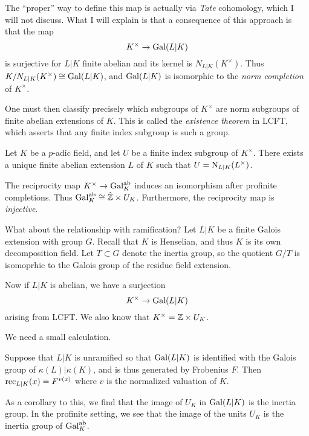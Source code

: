 The ``proper'' way to define this map is actually via \emph{Tate} cohomology, which I will not discuss.
What I will explain is that a consequence of this approach is that the map
\[ K^{\times} \to \operatorname{Gal}(L|K) \]
is surjective for $L|K$ finite abelian and its kernel is $N_{L|K}(K^{\times})$.
Thus $K/N_{L|K}(K^{\times}) \cong \operatorname{Gal}(L|K)$, and $\operatorname{Gal}(L|K)$ is isomorphic to the \emph{norm completion} of $K^{\times}$.

One must then classify precisely which subgroups of $K^{\times}$ are norm subgroups of finite abelian extensions of $K$.
This is called the \emph{existence theorem} in LCFT, which asserts that any finite index subgroup is such a group.

\begin{theorem}
  Let $K$ be a $p$-adic field, and let $U$ be a finite index subgroup of $K^{\times}$.
  There exists a unique finite abelian extension $L$ of $K$ such that $U = \operatorname{N}_{L|K}(L^{\times})$.
\end{theorem}

\begin{corollary}
  The reciprocity map $K^{\times} \to \operatorname{Gal}_{K}^{\mathrm{ab}}$ induces an isomorphism after profinite completions.
  Thus $\operatorname{Gal}_{K}^{\mathrm{ab}} \cong \hat{\mathbb{Z}} \times U_{K}$.
  Furthermore, the reciprocity map is \emph{injective}.
\end{corollary}

What about the relationship with ramification?
Let $L|K$ be a finite Galois extension with group $G$.
Recall that $K$ is Henselian, and thus $K$ is its own decomposition field.
Let $T \subset G$ denote the inertia group, so the quotient $G/T$ is isomoprhic to the Galois group of the residue field extension.

Now if $L|K$ is abelian, we have a surjection
\[ K^{\times} \to \operatorname{Gal}(L|K) \]
arising from LCFT.
We also know that $K^{\times} = \mathbb{Z} \times U_{K}$.

We need a small calculation.
\begin{lemma}
  Suppose that $L|K$ is unramified so that $\operatorname{Gal}(L|K)$ is identified with the Galois group of $\kappa(L)|\kappa(K)$, and is thus generated by Frobenius $F$.
  Then $\operatorname{rec}_{L|K}(x) = F^{v(x)}$ where $v$ is the normalized valuation of $K$.
\end{lemma}

As a corollary to this, we find that the image of $U_{K}$ in $\operatorname{Gal}(L|K)$ is the inertia group.
In the profinite setting, we see that the image of the units $U_{K}$ is the inertia group of $\operatorname{Gal}_{K}^{\mathrm{ab}}$.

